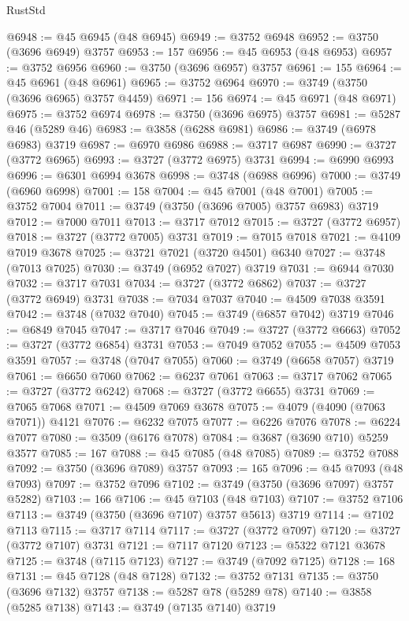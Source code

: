 \begin{lexlean}{RustStd}
\begin{coremodule}
@6948 := @45 @6945 (@48 @6945)
@6949 := @3752 @6948
@6952 := @3750 (@3696 @6949) @3757
@6953 := 157
@6956 := @45 @6953 (@48 @6953)
@6957 := @3752 @6956
@6960 := @3750 (@3696 @6957) @3757
@6961 := 155
@6964 := @45 @6961 (@48 @6961)
@6965 := @3752 @6964
@6970 := @3749 (@3750 (@3696 @6965) @3757 @4459)
@6971 := 156
@6974 := @45 @6971 (@48 @6971)
@6975 := @3752 @6974
@6978 := @3750 (@3696 @6975) @3757
@6981 := @5287 @46 (@5289 @46)
@6983 := @3858 (@6288 @6981)
@6986 := @3749 (@6978 @6983) @3719
@6987 := @6970 @6986
@6988 := @3717 @6987
@6990 := @3727 (@3772 @6965)
@6993 := @3727 (@3772 @6975) @3731
@6994 := @6990 @6993
@6996 := @6301 @6994 @3678
@6998 := @3748 (@6988 @6996)
@7000 := @3749 (@6960 @6998)
@7001 := 158
@7004 := @45 @7001 (@48 @7001)
@7005 := @3752 @7004
@7011 := @3749 (@3750 (@3696 @7005) @3757 @6983) @3719
@7012 := @7000 @7011
@7013 := @3717 @7012
@7015 := @3727 (@3772 @6957)
@7018 := @3727 (@3772 @7005) @3731
@7019 := @7015 @7018
@7021 := @4109 @7019 @3678
@7025 := @3721 @7021 (@3720 @4501) @6340
@7027 := @3748 (@7013 @7025)
@7030 := @3749 (@6952 @7027) @3719
@7031 := @6944 @7030
@7032 := @3717 @7031
@7034 := @3727 (@3772 @6862)
@7037 := @3727 (@3772 @6949) @3731
@7038 := @7034 @7037
@7040 := @4509 @7038 @3591
@7042 := @3748 (@7032 @7040)
@7045 := @3749 (@6857 @7042) @3719
@7046 := @6849 @7045
@7047 := @3717 @7046
@7049 := @3727 (@3772 @6663)
@7052 := @3727 (@3772 @6854) @3731
@7053 := @7049 @7052
@7055 := @4509 @7053 @3591
@7057 := @3748 (@7047 @7055)
@7060 := @3749 (@6658 @7057) @3719
@7061 := @6650 @7060
@7062 := @6237 @7061
@7063 := @3717 @7062
@7065 := @3727 (@3772 @6242)
@7068 := @3727 (@3772 @6655) @3731
@7069 := @7065 @7068
@7071 := @4509 @7069 @3678
@7075 := @4079 (@4090 (@7063 @7071)) @4121
@7076 := @6232 @7075
@7077 := @6226 @7076
@7078 := @6224 @7077
@7080 := @3509 (@6176 @7078)
@7084 := @3687 (@3690 @710) @5259 @3577
@7085 := 167
@7088 := @45 @7085 (@48 @7085)
@7089 := @3752 @7088
@7092 := @3750 (@3696 @7089) @3757
@7093 := 165
@7096 := @45 @7093 (@48 @7093)
@7097 := @3752 @7096
@7102 := @3749 (@3750 (@3696 @7097) @3757 @5282)
@7103 := 166
@7106 := @45 @7103 (@48 @7103)
@7107 := @3752 @7106
@7113 := @3749 (@3750 (@3696 @7107) @3757 @5613) @3719
@7114 := @7102 @7113
@7115 := @3717 @7114
@7117 := @3727 (@3772 @7097)
@7120 := @3727 (@3772 @7107) @3731
@7121 := @7117 @7120
@7123 := @5322 @7121 @3678
@7125 := @3748 (@7115 @7123)
@7127 := @3749 (@7092 @7125)
@7128 := 168
@7131 := @45 @7128 (@48 @7128)
@7132 := @3752 @7131
@7135 := @3750 (@3696 @7132) @3757
@7138 := @5287 @78 (@5289 @78)
@7140 := @3858 (@5285 @7138)
@7143 := @3749 (@7135 @7140) @3719

\end{coremodule}
\end{lexlean}
